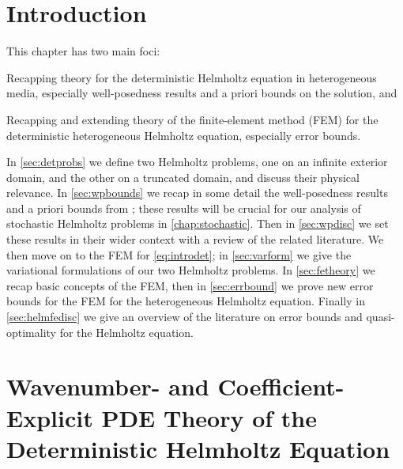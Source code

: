 \section{Introduction}
This chapter has two main foci:
\ben
\item Recapping theory for the deterministic Helmholtz equation in heterogeneous media, especially well-posedness results and a priori bounds on the solution, and
\item Recapping and extending theory of the finite-element method (FEM) for the deterministic heterogeneous Helmholtz equation, especially error bounds.
  \een


In \cref{sec:detprobs} we  define two Helmholtz problems, one on an infinite exterior domain, and the other on a truncated domain, and discuss their physical relevance. In \cref{sec:wpbounds} we  recap in some detail the well-posedness results and a priori bounds from \cite{GrPeSp:19}; these results will be crucial for our analysis of stochastic Helmholtz problems in \cref{chap:stochastic}. Then in \cref{sec:wpdisc} we set these results in their wider context with a review of the related literature. We  then move on to the FEM for \eqref{eq:introdet}; in \cref{sec:varform} we give the variational formulations of our two Helmholtz problems. In \cref{sec:fetheory} we recap basic concepts of the FEM, then in \cref{sec:errbound} we  prove new error bounds for the FEM for the heterogeneous Helmholtz equation. Finally in \cref{sec:helmfedisc} we  give an overview of the literature on error bounds and quasi-optimality for the Helmholtz equation.


\section{Wavenumber- and Coefficient-Explicit PDE Theory of the Deterministic Helmholtz Equation}
  

